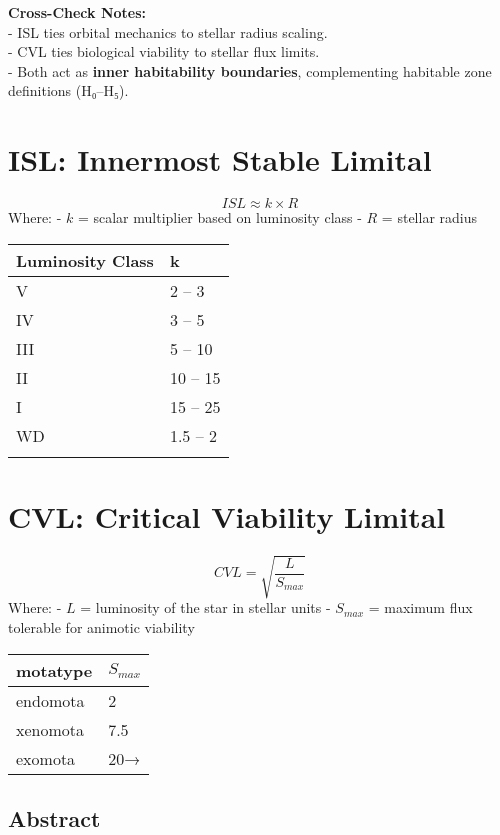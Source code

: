 \documentclass[
  letterpaper,
]{book}
\begin{document}
\textbf{Cross-Check Notes:}\\
- ISL ties orbital mechanics to stellar radius scaling.\\
- CVL ties biological viability to stellar flux limits.\\
- Both act as \textbf{inner habitability boundaries}, complementing
habitable zone definitions (H₀--H₅).

\chapter{ISL: Innermost Stable
Limital}\label{isl-innermost-stable-limital}

\[
ISL ≈ k \times R
\] Where: - \(k\) = scalar multiplier based on luminosity class - \(R\)
= stellar radius

\begin{longtable}[]{@{}ll@{}}
\toprule\noalign{}
Luminosity Class & k \\
\midrule\noalign{}
\endhead
\bottomrule\noalign{}
\endlastfoot
V & 2 -- 3 \\
IV & 3 -- 5 \\
III & 5 -- 10 \\
II & 10 -- 15 \\
I & 15 -- 25 \\
WD & 1.5 -- 2 \\
& \\
\end{longtable}

\chapter{CVL: Critical Viability
Limital}\label{cvl-critical-viability-limital}

\[
CVL = \sqrt{\frac{L}{S_{max}}}
\] Where: - \(L\) = luminosity of the star in stellar units -
\(S_{max}\) = maximum flux tolerable for animotic viability

\begin{longtable}[]{@{}ll@{}}
\toprule\noalign{}
motatype & \(S_{max}\) \\
\midrule\noalign{}
\endhead
\bottomrule\noalign{}
\endlastfoot
endomota & 2 \\
xenomota & 7.5 \\
exomota & 20→ \\
\end{longtable}

\section{Abstract}\label{abstract-25}
\end{document}
